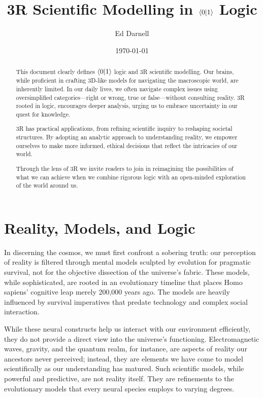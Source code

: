 \documentclass[12pt]{article}
\title{3R Scientific Modelling in \(\langle 0 | 1 \rangle\) Logic}
\author{Ed Darnell}
\date{\today}
\begin{document}
\maketitle
\begin{abstract}
    This document clearly defines \(\langle 0 | 1 \rangle\) logic and 3R scientific modelling. Our brains, while proficient in crafting 3D-like models for navigating the macroscopic world, are inherently limited. In our daily lives, we often navigate complex issues using oversimplified categories—right or wrong, true or false—without consulting reality. 3R rooted in \qbit{} logic, encourages deeper analysis, urging us to embrace uncertainty in our quest for knowledge.

    3R has practical applications, from refining scientific inquiry to reshaping societal structures. By adopting an analytic approach to understanding reality, we empower ourselves to make more informed, ethical decisions that reflect the intricacies of our world.

    Through the lens of 3R we invite readers to join in reimagining the possibilities of what we can achieve when we combine rigorous logic with an open-minded exploration of the world around us.
\end{abstract}
\section*{Reality, Models, and Logic}
In discerning the cosmos, we must first confront a sobering truth: our perception of reality is filtered through mental models sculpted by evolution for pragmatic survival, not for the objective dissection of the universe's fabric. These models, while sophisticated, are rooted in an evolutionary timeline that places Homo sapiens' cognitive leap merely 200,000 years ago. The models are heavily influenced by survival imperatives that predate technology and complex social interaction.

While these neural constructs help us interact with our environment efficiently, they do not provide a direct view into the universe's functioning. Electromagnetic waves, gravity, and the quantum realm, for instance, are aspects of reality our ancestors never perceived; instead, they are elements we have come to model scientifically as our understanding has matured. Such scientific models, while powerful and predictive, are not reality itself. They are refinements to the evolutionary models that every neural species employs to varying degrees.
\end{document}
